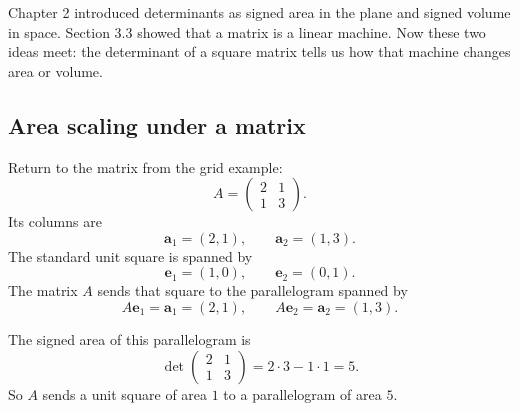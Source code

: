 Chapter 2 introduced determinants as signed area in the plane and signed volume in
space.  Section 3.3 showed that a matrix is a linear machine.  Now these two ideas meet:
the determinant of a square matrix tells us how that machine changes area or volume.

\subsection{Area scaling under a matrix}

Return to the matrix from the grid example:
\[
    A=
    \begin{pmatrix}
        2&1\\
        1&3
    \end{pmatrix}.
\]
Its columns are
\[
    \mathbf a_1=(2,1),
    \qquad
    \mathbf a_2=(1,3).
\]
The standard unit square is spanned by
\[
    \mathbf e_1=(1,0),
    \qquad
    \mathbf e_2=(0,1).
\]
The matrix \(A\) sends that square to the parallelogram spanned by
\[
    A\mathbf e_1=\mathbf a_1=(2,1),
    \qquad
    A\mathbf e_2=\mathbf a_2=(1,3).
\]

The signed area of this parallelogram is
\[
    \det
    \begin{pmatrix}
        2&1\\
        1&3
    \end{pmatrix}
    =
    2\cdot3-1\cdot1
    =
    5.
\]
So \(A\) sends a unit square of area \(1\) to a parallelogram of area \(5\).

